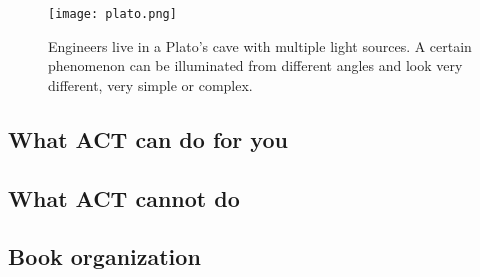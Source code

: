 \begin{figure}[h]
\texttt{[image: plato.png]}
\caption{\label{fig:aspects}
    Engineers live in a Plato's cave with multiple light sources.
    A certain phenomenon can be illuminated from different angles
    and look very different, very simple or complex.
}
\end{figure} 

\subsection{What ACT can do for you}




\subsection{What ACT cannot do}


\subsection{Book organization}

